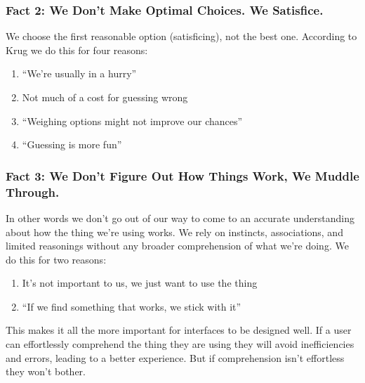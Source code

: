 \documentclass{article}%
\begin{document}
  \subsubsection{Fact 2: We Don't Make Optimal Choices. We Satisfice.}
    We choose the first reasonable option (satisficing), not the best one. \newline
    According to Krug we do this for four reasons:
    \begin{enumerate}
      \item ``We're usually in a hurry''
      \item Not much of a cost for guessing wrong
      \item ``Weighing options might not improve our chances''
      \item ``Guessing is more fun''
    \end{enumerate}
  \subsubsection{Fact 3: We Don't Figure Out How Things Work, We Muddle Through.}
    In other words we don't go out of our way to come to an accurate understanding
    about how the thing we're using works. We rely on instincts, associations, and
    limited reasonings without any broader comprehension of what we're doing.\newline
    We do this for two reasons:
    \begin{enumerate}
      \item It's not important to us, we just want to use the thing
      \item ``If we find something that works, we stick with it''
    \end{enumerate}
    This makes it all the more important for interfaces to be designed well. If a user
    can effortlessly comprehend the thing they are using they will avoid inefficiencies
    and errors, leading to a better experience. But if comprehension isn't effortless
    they won't bother.
\end{document}
